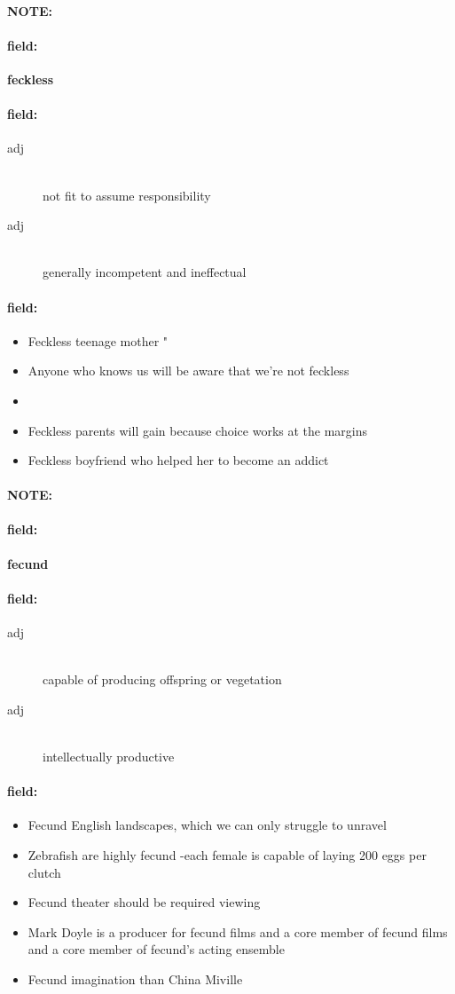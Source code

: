 \documentclass[12pt]{article}
\newenvironment{note}{\paragraph{NOTE:}}{}
\newenvironment{field}{\paragraph{field:}}{}
\begin{document}
\begin{note}
\begin{field}
\textbf{\large feckless}
\end{field}


\begin{field}
\begin{description}
\item[adj] \hfill \\ 
not fit to assume responsibility

\item[adj] \hfill \\ 
generally incompetent and ineffectual

\end{description}
\end{field}

\begin{field}
\begin{itemize}
\item Feckless teenage mother " 
\item Anyone who knows us will be aware that we're not feckless
\item 
\item Feckless parents will gain because choice works at the margins
\item Feckless boyfriend who helped her to become an addict
\end{itemize}
\end{field}
\end{note}
\begin{note}
\begin{field}
\textbf{\large fecund}
\end{field}


\begin{field}
\begin{description}
\item[adj] \hfill \\ 
capable of producing offspring or vegetation

\item[adj] \hfill \\ 
intellectually productive

\end{description}
\end{field}

\begin{field}
\begin{itemize}
\item Fecund English landscapes, which we can only struggle to unravel
\item Zebrafish are highly fecund -each female is capable of laying 200 eggs per clutch
\item Fecund theater should be required viewing
\item Mark Doyle is a producer for fecund films and a core member of fecund films and a core member of fecund's acting ensemble
\item Fecund imagination than China Miville
\end{itemize}
\end{field}
\end{note}
\end{document}
